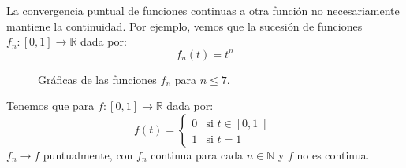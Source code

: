 \begin{ejemplo}
    La convergencia puntual de funciones continuas a otra función no necesariamente mantiene la continuidad. Por ejemplo, vemos que la sucesión de funciones $f_n:[0,1]\to \mathbb{R}$ dada por:
    \begin{equation*}
        f_n(t) = t^n
    \end{equation*}

    \begin{figure}[H]
        \centering
    \caption{Gráficas de las funciones $f_n$ para $n\leq 7$.}
    \end{figure}

    \noindent
    Tenemos que para $f:[0,1]\to \mathbb{R}$ dada por:
    \begin{equation*}
        f(t) = \left\{\begin{array}{ll}
            0 & \text{si\ } t\in \left[0,1\right[ \\
            1 & \text{si\ } t = 1
        \end{array}\right. 
    \end{equation*}
    $f_n\to f$ puntualmente, con $f_n$ continua para cada $n\in \mathbb{N}$ y $f$ no es continua.
\end{ejemplo}

